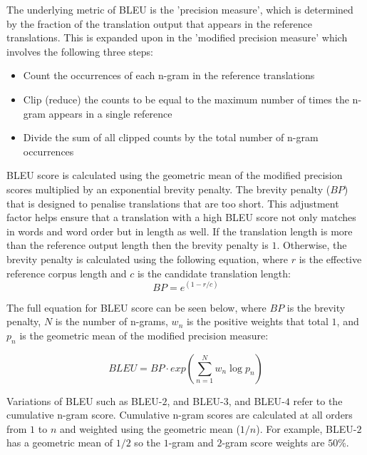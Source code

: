 The underlying metric of \acrshort{BLEU} is the 'precision measure', which is determined by the fraction of the translation output that appears in the reference translations. This is expanded upon in the 'modified precision measure' which involves the following three steps:
\begin{itemize}
    \item Count the occurrences of each n-gram in the reference translations
    \item Clip (reduce) the counts to be equal to the maximum number of times the n-gram appears in a single reference
    \item Divide the sum of all clipped counts by the total number of n-gram occurrences
\end{itemize}

\acrshort{BLEU} score is calculated using the geometric mean of the modified precision scores multiplied by an exponential brevity penalty.
The brevity penalty ($BP$) that is designed to penalise translations that are too short. This adjustment factor helps ensure that a translation with a high \acrshort{BLEU} score not only matches in words and word order but in length as well.
If the translation length is more than the reference output length then the brevity penalty is $1$. Otherwise, the brevity penalty is calculated using the following equation, where $r$ is the effective reference corpus length and $c$ is the candidate translation length:
\begin{equation}
    BP = e^{(1-r/c)}
\end{equation}

The full equation for BLEU score can be seen below, where $BP$ is the brevity penalty, $N$ is the number of n-grams, $w_n$ is the positive weights that total $1$, and $p_n$ is the geometric mean of the modified precision measure:

\begin{equation}
    BLEU = BP \cdot exp\left (  \sum_{n=1}^{N} w_{n} \log  p_{n}\right )
\end{equation}


Variations of BLEU such as \acrshort{BLEU}-$2$, and \acrshort{BLEU}-$3$, and \acrshort{BLEU}-$4$ refer to the cumulative n-gram score. Cumulative n-gram scores are calculated at all orders from $1$ to $n$ and weighted using the geometric mean ($1/n$). For example, \acrshort{BLEU}-$2$ has a geometric mean of $1/2$ so the $1$-gram and $2$-gram score weights are $50$\%.

